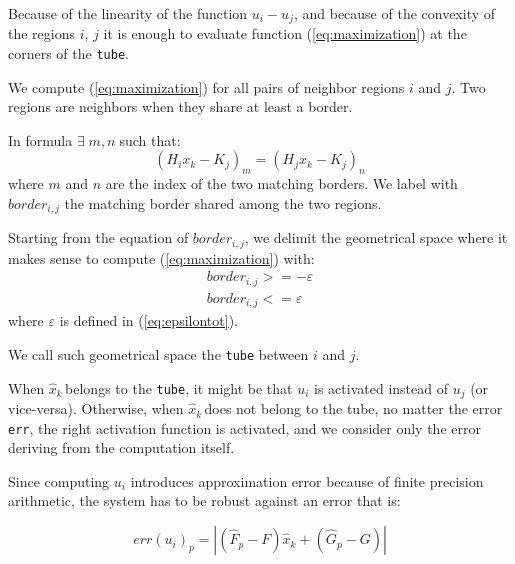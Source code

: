\documentclass[sigconf]{acmart}
\newcommand{\statevar}{x_{k}}
\newcommand{\qstatevar}{\hat{x}_{k}}
\newcommand{\qstatevarmath}{$\hat{x}_{k}\,$}
\begin{document}
Because of the linearity of the function $u_{i}-u_{j}$, and because of the convexity of the regions $i$, $j$ it is enough to evaluate function (\ref{eq:maximization}) at the corners of the \texttt{tube}.


We compute (\ref{eq:maximization}) for all pairs of neighbor regions $i$ and $j$. Two regions are neighbors when they share at least a border.

In formula $\exists\; m,n \;$such that:
\begin{equation}
(H_{i}\statevar-K_{j})_{m} = (H_{j}\statevar-K_{j})_{n}
\end{equation}
where $m$ and $n$ are the index of the two matching borders. We label with $border_{i,j}$ the matching border shared among the two regions.

Starting from the equation of $border_{i,j}$, we delimit the geometrical space where it makes sense to compute (\ref{eq:maximization}) with: 
\begin{equation}
\begin{aligned}
border_{i,j} >= -\varepsilon\\
border_{i,j} <= \varepsilon
\end{aligned} 
\end{equation}
where $\varepsilon$ is defined in (\ref{eq:epsilontot}).

We call such geometrical space the \texttt{tube} between $i$ and $j$.

When \qstatevarmath belongs to the \texttt{tube}, it might be that $u_{i}$ is activated instead of $u_{j}$ (or vice-versa). Otherwise, when \qstatevarmath does not belong to the tube, no matter the error \texttt{err}, the right activation function is activated, and we consider only the error deriving from the computation itself.

Since computing $u_{i}$ introduces approximation error because of finite precision arithmetic, the system has to be robust against an error that is:

\begin{equation}\label{eq:fperror}
err(u_{i})_{p}=|(\hat{F}_{p}-F)\qstatevar+(\hat{G}_{p}-G)|
\end{equation}
\end{document}
